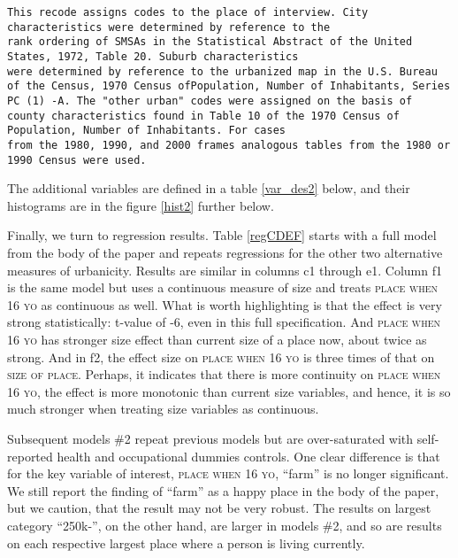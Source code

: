 \documentclass[10pt, letterpaper]{article}
\begin{document}
\begin{spacing}{2.0}
{\begin{verbatim}
This recode assigns codes to the place of interview. City
characteristics were determined by reference to the
rank ordering of SMSAs in the Statistical Abstract of the United
States, 1972, Table 20. Suburb characteristics
were determined by reference to the urbanized map in the U.S. Bureau
of the Census, 1970 Census ofPopulation, Number of Inhabitants, Series
PC (1) -A. The "other urban" codes were assigned on the basis of
county characteristics found in Table 10 of the 1970 Census of
Population, Number of Inhabitants. For cases
from the 1980, 1990, and 2000 frames analogous tables from the 1980 or
1990 Census were used.
\end{verbatim}

}

The additional variables are defined in a table \ref{var_des2} below, and their
histograms are in the figure \ref{hist2} further below.

\begin{spacing}{.9}

{\footnotesize }
\end{spacing}




Finally, we turn to regression results. Table \ref{regCDEF} starts with a full model from the body of the paper and repeats
regressions for the other two alternative measures of urbanicity.
Results are similar in columns c1 through e1. Column f1 is the same model but
uses a continuous measure of size and treats \textsc{place when 16 yo} as continuous as well.
%
What is worth highlighting is that the effect is very strong statistically:
t-value of -6, even in this full specification. And \textsc{place when 16 yo}
has stronger size effect than current size of a place now, about twice as strong. And in f2, the
effect size on \textsc{place when 16 yo} is three times of that on \textsc{size
  of place}. Perhaps, it indicates that there is more continuity on
\textsc{place when 16 yo}, the effect is more monotonic than current size
variables, and hence, it is so much stronger when treating size variables as continuous. 

Subsequent models \#2 repeat previous models but are over-saturated with
self-reported health and occupational dummies controls.
One clear difference is that for the key variable of interest, \textsc{place
  when 16 yo},  ``farm'' is no longer significant. We still report the finding
of ``farm'' as a happy place in the body of the paper, but we caution, that the
result may not be very robust. The results on largest category ``250k-'', on the
other hand, are larger in models \#2, and so are results on each respective
largest place where a person is living currently. 



\end{spacing}
\end{document}
